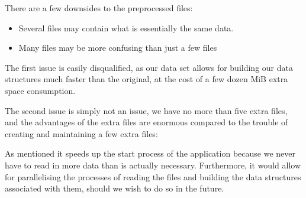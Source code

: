 
There are a few downsides to the preprocessed files:
\begin{itemize}
	\item Several files may contain what is essentially the same data.
	\item Many files may be more confusing than just a few files
\end{itemize}

The first issue is easily disqualified, as our data set allows for building our data structures much faster than the original, at the cost of a few dozen MiB extra space consumption.

The second issue is simply not an issue, we have no more than five extra files, and the advantages of the extra files are enormous compared to the trouble of creating and maintaining a few extra files:

As mentioned it speeds up the start process of the application because we never have to read in more data than is actually necessary. Furthermore, it would allow for parallelising the processes of reading the files and building the data structures associated with them, should we wish to do so in the future.
